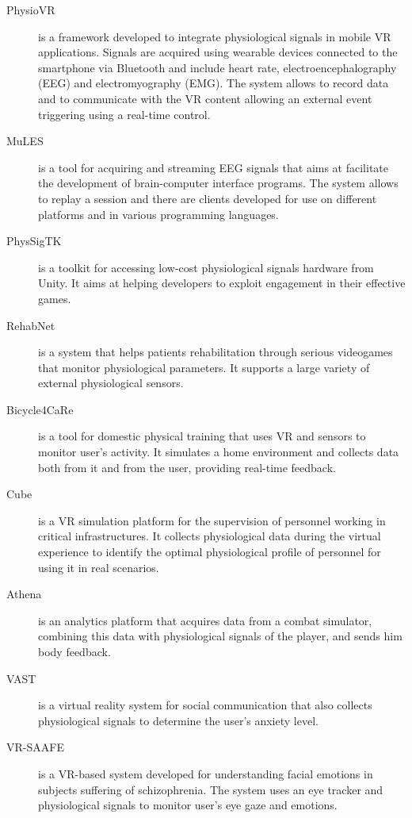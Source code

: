 \documentclass[binding=0.6cm,LaM]{sapthesis}
\begin{document}
\begin{description}

\item [PhysioVR] \cite{munoz2016physiovr} is a framework developed to integrate physiological signals in mobile VR applications. Signals are acquired using wearable devices connected to the smartphone via Bluetooth and include heart rate, electroencephalography (EEG) and electromyography (EMG). The system allows to record data and to communicate with the VR content allowing an external event triggering using a real-time control.

\item [MuLES] \cite{cassani2015mules} is a tool for acquiring and streaming EEG signals that aims at facilitate the development of brain-computer interface programs. The system allows to replay a session and there are clients developed for use on different platforms and in various programming languages.

\item [PhysSigTK] \cite{rank2015physsigtk} is a toolkit for accessing low-cost physiological signals hardware from Unity. It aims at helping developers to exploit engagement in their effective games. 

\item [RehabNet] \cite{vourvopoulos2013rehabnet} is a system that helps patients rehabilitation through serious videogames that monitor physiological parameters. It supports a large variety of external physiological sensors. 

\item [Bicycle4CaRe] \cite{baldassini2017customization} is a tool for domestic physical training that uses VR and sensors to monitor user's activity. It simulates a home environment and collects data both from it and from the user, providing real-time feedback.

\item [Cube] \cite{cepisca2015platform} is a VR simulation platform for the supervision of personnel working in critical infrastructures. It collects physiological data during the virtual experience to identify the optimal physiological profile of personnel for using it in real scenarios.

\item [Athena] \cite{mcgregor2017integrating} is an analytics platform that acquires data from a combat simulator, combining this data with physiological signals of the player, and sends him body feedback.

\item [VAST] \cite{kuriakose2015understanding} is a virtual reality system for social communication that also collects physiological signals to determine the user's anxiety level.

\item [VR-SAAFE] \cite{bekele2017design} is a VR-based system developed for understanding facial emotions in subjects suffering of schizophrenia. The system uses an eye tracker and physiological signals to monitor user's eye gaze and emotions.

\end{description}
\end{document}
